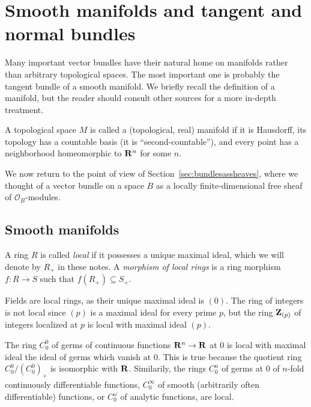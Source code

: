 \documentclass[a4paper,openany]{scrbook}
\begin{document}
\section{Smooth manifolds and tangent and normal bundles}

Many important vector bundles have their natural home on manifolds rather than arbitrary topological spaces. The most important one is probably the tangent bundle of a smooth manifold. We briefly recall the definition of a manifold, but the reader should consult other sources for a more in-depth treatment.

\begin{defn}
A topological space $M$ is called a (topological, real) manifold if it is Hausdorff, its topology has a countable basis (it is ``second-countable''), and every point has a neighborhood homeomorphic to $\mathbf R^n$ for some $n$.
\end{defn}

We now return to the point of view of Section~\ref{sec:bundlesassheaves}, where we thought of a vector bundle on a space $B$ as a locally finite-dimensional free sheaf of $\mathcal O_B$-modules.

\subsection{Smooth manifolds}\label{subsec:smooth-manifolds}

\begin{defn}
A ring $R$ is called \emph{local} if it possesses a unique maximal ideal, which we will denote by $R_+$ in these notes. A \emph{morphism of local rings} is a ring morphism $f\colon R \to S$ such that $f(R_+) \subseteq S_+$.
\end{defn}

\begin{example}
Fields are local rings, as their unique maximal ideal is $(0)$. The ring of integers is not local since $(p)$ is a maximal ideal for every prime $p$, but the ring $\mathbf Z_{(p)}$ of integers localized at $p$ is local with maximal ideal $(p)$. 

The ring $C^0_0$ of germs of continuous functions $\mathbf R^n \to \mathbf R$ at $0$ is local with maximal ideal the ideal of germs which vanish at $0$. This is true because the quotient ring $C^0_0/(C^0_0)_+$ is isomorphic with $\mathbf R$. Similarily, the rings $C^n_0$ of germs at $0$ of $n$-fold continuously differentiable functions, $C^\infty_0$ of smooth (arbitrarily often differentiable) functions, or $C^\omega_0$ of analytic functions, are local.
\end{example}
\end{document}
